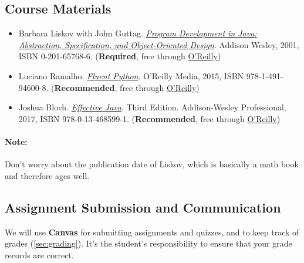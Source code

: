 \documentclass[11pt]{article}
\begin{document}
\subsection{Course Materials}
\begin{itemize}
  \item Barbara Liskov with John Guttag. \href{https://www.amazon.com/Program-Development-Java-Specification-Object-Oriented/dp/0201657686/ref=sr_1_2?dchild=1&qid=1626231221&refinements=p_27\%3ABarbara+Liskov&s=books&sr=1-2&text=Barbara+Liskov}{\emph{Program
  Development in Java: Abstraction, Specification, and Object-Oriented  Design}}. Addison Wesley, 2001, ISBN 0-201-65768-6.  (\textbf{Required}, free through \href{https://learning.oreilly.com/library/view/program-development-in/9780768685299/}{ O'Reilly})


\item Luciano Ramalho. \href{https://www.amazon.com/Fluent-Python-Concise-Effective-Programming-dp-1492056359/dp/1492056359/ref=dp_ob_title_bk}{\emph{Fluent Python}}. O'Reilly Media, 2015, ISBN 978-1-491-94600-8. (\textbf{Recommended}, free through \href{https://learning.oreilly.com/library/view/fluent-python/9781492056348/}{O'Reilly})

\item Joshua Bloch.
\href{https://www.amazon.com/Effective-Java-Joshua-Bloch/dp/0134685997/ref=sr_1_1?dchild=1&keywords=effective+java&qid=1626231154&sr=8-1}{\emph{Effective
  Java}}. Third Edition. Addison-Wesley Professional, 2017, ISBN
  978-0-13-468599-1. (\textbf{Recommended}, free through
        \href{https://learning.oreilly.com/library/view/effective-java-3rd/9780134686097/}{O'Reilly})

\end{itemize}

\paragraph{Note:} Don't worry about the publication date of Liskov, which is basically a math book and therefore ages well.

\subsection{Assignment Submission and Communication}
We will use \textbf{Canvas} for submitting assignments and quizzes, and to keep track of grades (\autoref{sec:grading}). 
It's the student's responsibility to ensure that your grade records are correct.
\end{document}
